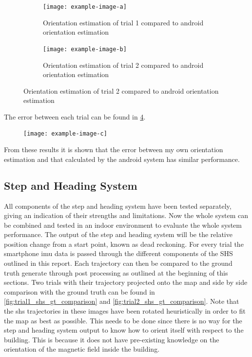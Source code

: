\begin{figure}[H]
	\centering
	\begin{subfigure}[t]{.45\textwidth}
	\centering
	\texttt{[image: example-image-a]}
	\caption{Orientation estimation of trial 1 compared to android orientation estimation}
	\label{fig:trail1 - shs}
\end{subfigure}\quad
\begin{subfigure}[t]{.45\textwidth}
	\centering
	\texttt{[image: example-image-b]}
	\caption{Orientation estimation of trial 2 compared to android orientation estimation}
	\label{fig:trail2 - shs}
\end{subfigure}
\end{figure}

The error between each trial can be found in \cref{fig:orientation_comparison}.

\begin{figure}[H]
	\centering
	\texttt{[image: example-image-c]}
	\caption{}
	\label{fig:orientation_comparison}
\end{figure}

From these results it is shown that the error between my own orientation estimation and that calculated by the android system has similar performance.

\subsection{Step and Heading System}
All components of the step and heading system have been tested separately, giving an indication of their strengths and limitations. Now the whole system can be combined and tested in an indoor environment to evaluate the whole system performance. The output of the step and heading system will be the relative position change from a start point, known as dead reckoning.
For every trial the smartphone imu data is passed through the different components of the SHS outlined in this report. Each trajectory can then be compared to the ground truth generate through post processing as outlined at the beginning of this sections. Two trials with their trajectory projected onto the map and side by side comparison with the ground truth can be found in \cref{fig:trial1_shs_gt_comparison} and \cref{fig:trial2_shs_gt_comparison}. Note that the shs trajectories in these images have been rotated heuristically in order to fit the map as best as possible. This needs to be done since there is no way for the step and heading system output to know how to orient itself with respect to the building. This is because it does not have pre-existing knowledge on the orientation of the magnetic field inside the building.

